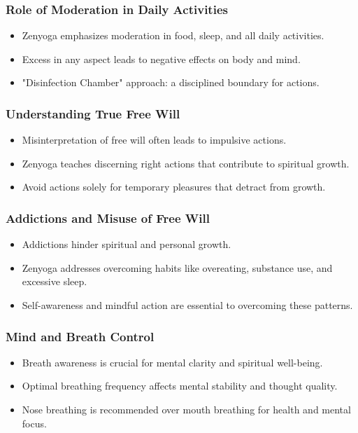 \begin{frame}[fragile]\frametitle{Role of Moderation in Daily Activities}
    \begin{itemize}
        \item Zenyoga emphasizes moderation in food, sleep, and all daily activities.
        \item Excess in any aspect leads to negative effects on body and mind.
        \item "Disinfection Chamber" approach: a disciplined boundary for actions.
    \end{itemize}
\end{frame}

\begin{frame}[fragile]\frametitle{Understanding True Free Will}
    \begin{itemize}
        \item Misinterpretation of free will often leads to impulsive actions.
        \item Zenyoga teaches discerning right actions that contribute to spiritual growth.
        \item Avoid actions solely for temporary pleasures that detract from growth.
    \end{itemize}
\end{frame}

\begin{frame}[fragile]\frametitle{Addictions and Misuse of Free Will}
    \begin{itemize}
        \item Addictions hinder spiritual and personal growth.
        \item Zenyoga addresses overcoming habits like overeating, substance use, and excessive sleep.
        \item Self-awareness and mindful action are essential to overcoming these patterns.
    \end{itemize}
\end{frame}

\begin{frame}[fragile]\frametitle{Mind and Breath Control}
    \begin{itemize}
        \item Breath awareness is crucial for mental clarity and spiritual well-being.
        \item Optimal breathing frequency affects mental stability and thought quality.
        \item Nose breathing is recommended over mouth breathing for health and mental focus.
    \end{itemize}
\end{frame}

